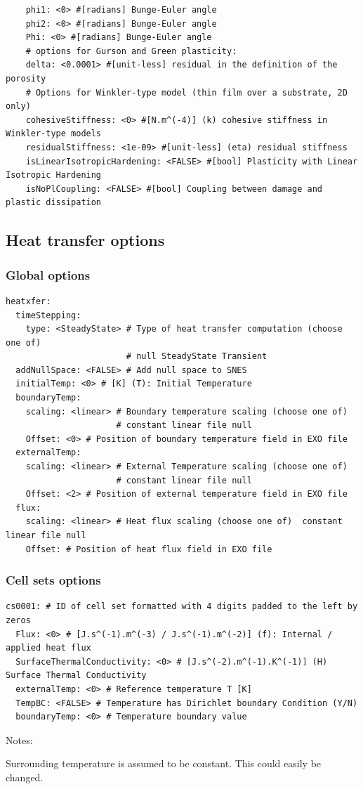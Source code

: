 \documentclass[10pt,oneside]{report}
\begin{document}
\begin{verbatim}
    phi1: <0> #[radians] Bunge-Euler angle
    phi2: <0> #[radians] Bunge-Euler angle
    Phi: <0> #[radians] Bunge-Euler angle
    # options for Gurson and Green plasticity:
    delta: <0.0001> #[unit-less] residual in the definition of the porosity
    # Options for Winkler-type model (thin film over a substrate, 2D only)
    cohesiveStiffness: <0> #[N.m^(-4)] (k) cohesive stiffness in Winkler-type models 
    residualStiffness: <1e-09> #[unit-less] (eta) residual stiffness 
    isLinearIsotropicHardening: <FALSE> #[bool] Plasticity with Linear Isotropic Hardening 
    isNoPlCoupling: <FALSE> #[bool] Coupling between damage and plastic dissipation 
\end{verbatim}





\subsection{Heat transfer options}
\subsubsection{Global options}

\begin{verbatim}
heatxfer:
  timeStepping:
    type: <SteadyState> # Type of heat transfer computation (choose one of)  
                        # null SteadyState Transient
  addNullSpace: <FALSE> # Add null space to SNES 
  initialTemp: <0> # [K] (T): Initial Temperature 
  boundaryTemp:
    scaling: <linear> # Boundary temperature scaling (choose one of)  
                      # constant linear file null
    Offset: <0> # Position of boundary temperature field in EXO file 
  externalTemp:
    scaling: <linear> # External Temperature scaling (choose one of)  
                      # constant linear file null
    Offset: <2> # Position of external temperature field in EXO file 
  flux:
    scaling: <linear> # Heat flux scaling (choose one of)  constant linear file null
    Offset: # Position of heat flux field in EXO file 
\end{verbatim}

\subsubsection{Cell sets options}
\begin{verbatim}
cs0001: # ID of cell set formatted with 4 digits padded to the left by zeros
  Flux: <0> # [J.s^(-1).m^(-3) / J.s^(-1).m^(-2)] (f): Internal / applied heat flux 
  SurfaceThermalConductivity: <0> # [J.s^(-2).m^(-1).K^(-1)] (H) Surface Thermal Conductivity 
  externalTemp: <0> # Reference temperature T [K] 
  TempBC: <FALSE> # Temperature has Dirichlet boundary Condition (Y/N) 
  boundaryTemp: <0> # Temperature boundary value 
\end{verbatim}
Notes:
\begin{compactenum}
\item Surrounding temperature is assumed to be constant. This could easily be changed.
\end{compactenum}
\end{document}
